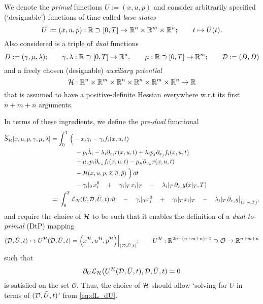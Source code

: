 \documentclass[11pt]{article}
\begin{document}
We denote the \emph{primal} functions $U := (x,u,p)$ and consider arbitrarily specified (`designable') functions of time called \emph{base states} 
\[
\bar{U} := (\bar{x},\bar{u},\bar{p}): \mathbb R \supset [0,T] \to \mathbb R^n \times \mathbb R^m \times \mathbb R^n; \qquad t \mapsto \bar{U}(t).
\]
Also considered is a triple of \emph{dual} functions
\[
D := (\gamma, \mu, \lambda); \qquad \gamma, \lambda: \mathbb R \supset [0,T] \to \mathbb R^n, \qquad \mu: \mathbb R \supset [0,T] \to \mathbb R^m; \qquad \mathcal{D} := (D, \dot{D})
\]
and a freely chosen (designable) \emph{auxiliary potential}
\[
\mathcal{H}: \mathbb R^n \times \mathbb R^m \times \mathbb R^n \times \mathbb R^n \times \mathbb R^m \times \mathbb R^n \to \mathbb R
\]
that is assumed to have a positive-definite Hessian everywhere w.r.t its first $n+m+n$ arguments.

In terms of these ingredients, we define the \emph{pre-dual} functional
\begin{equation}\label{eq:pre_dual}
\begin{aligned}
    \widehat{S}_{\mathcal{H}}[x,u,p, \gamma, \mu, \lambda] & = \int_0^T \Big( - x_i \dot{\gamma}_i - \gamma_i f_i(x,u,t) \\
    & \qquad \qquad - p_i \dot{\lambda}_i - \lambda_i \partial_{x_i} r(x,u,t) + \lambda_i p_j \partial_{x_j} f_i (x,u,t) \\
    & \qquad \qquad + \mu_\kappa p_i \partial_{u_\kappa} f_i(x,u,t) - \mu_\kappa \partial_{u_\kappa} r (x,u,t)  \\
    & \qquad \qquad  - \mathcal{H}(x,u,p,\bar{x}, \bar{u}, \bar{p}) \ \Big) \, dt \\
    & \qquad \qquad - \gamma_i|_0 \, x^0_i \quad + \quad \gamma_i|_T \, x_i|_T \quad - \quad \lambda_i|_T \, \partial_{x_i} g(x|_T,T)  \\
    & =: \int_0^T \mathcal{L}_{\mathcal{H}}(U,\mathcal{D}, \bar{U}, t) \,dt \quad - \quad \gamma_i|_0 \, x^0_i \quad + \quad \gamma_i|_T \, x_i|_T  \quad - \quad  \lambda_i|_T \, \partial_{x_i} g\big|_{(x|_T,T)} ,
\end{aligned}
\end{equation}
and require the choice of $\mathcal{H}$ to be such that it enables the definition of a \emph{dual-to-primal} (DtP) mapping
\[
(\mathcal{D}, \bar{U}, t) \mapsto U^{\mathcal{H}}(\mathcal{D}, \bar{U}, t) = \Big(x^{\mathcal{H}}, u^{\mathcal{H}}, p^{\mathcal{H}} \Big)\Big|_{(\mathcal{D}, \bar{U}, t)}; \qquad U^{\mathcal{H}}: \mathbb R^{2n+(n+m+n)+1} \supset \mathcal{O} \to \mathbb R^{n+m+n} 
\]
such that
\begin{equation}\label{eq:dL_dU}
    \partial_U \mathcal{L}_{\mathcal{H}} \big( U^{\mathcal{H}}(\mathcal{D}, \bar{U}, t), \mathcal{D}, \bar{U}, t) = 0
\end{equation}
is satisfied on the set $\mathcal{O}$. Thus, the choice of $\mathcal{H}$ should allow `solving for $U$ in terms of $(\mathcal{D}, \bar{U}, t)$' from \eqref{eq:dL_dU}.
\end{document}
